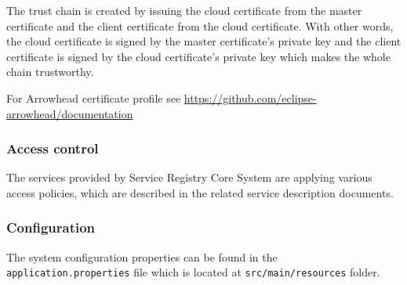 \documentclass[a4paper]{arrowhead}
\begin{document}
The trust chain is created by issuing the cloud certificate from the master certificate and the client certificate from the cloud certificate. With other words, the cloud certificate is signed by the master certificate's private key and the client certificate is signed by the cloud certificate's private key which makes the whole chain trustworthy.

For Arrowhead certificate profile see \url{https://github.com/eclipse-arrowhead/documentation}

\subsubsection {Access control}
The services provided by Service Registry Core System are applying various access policies, which are described in the related service description documents.

\subsubsection {Configuration}
   
The system configuration properties can be found in the \texttt{application.properties} file which is located at \texttt{src/main/resources} folder.
\end{document}

